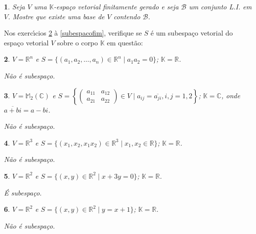 \documentclass[12pt]{exam}
\newtheorem{exercicio}{}
\newcommand{\real}{\mathbb{R}}
\newcommand{\complex}{\mathbb{C}}
\newcommand{\cp}[1]{\mathbb{#1}}
\begin{document}
\begin{exercicio}
  Seja $V$ uma $\cp{K}$-espa\c{c}o vetorial finitamente gerado e seja $\mathcal{B}$ um conjunto L.I. em $V$. Mostre que existe uma base de $V$ contendo $\mathcal{B}$.
\end{exercicio}

Nos exerc{\'\i}cios \ref{subespacoinicio} \`a \ref{subespacofim}, verifique se $S$ \'e um subespa\c{c}o vetorial do espa\c{c}o vetorial $V$ sobre o corpo $\cp{K}$ em quest\~ao:
\begin{exercicio}\label{subespacoinicio}
$V = \real^n$ e $S = \{(a_1, a_2, \dots, a_n) \in \real^n \mid a_1a_2 = 0\}$; $\cp{K} = \real$.
\begin{solucao}
  N\~ao \'e subespa\c{c}o.
\end{solucao}
\end{exercicio}

\begin{exercicio}
$V = \cp{M}_2(\complex)$ e $S = \left\{\begin{pmatrix} a_{11} & a_{12}\\ a_{21} & a_{22}\end{pmatrix} \in V \mid a_{ij} = \overline{a_{ji}}, i, j = 1, 2\right\}$; $\cp{K} = \complex$, onde $\overline{a + bi} = a - bi$.
\begin{solucao}
  N\~ao \'e subespa\c{c}o.
\end{solucao}
\end{exercicio}

\begin{exercicio}
$V = \real^3$ e $S = \{(x_1, x_2, x_1x_2) \in \real^3 \mid x_1, x_2 \in \real\}$; $\cp{K} = \real$.
\begin{solucao}
  N\~ao \'e subespa\c{c}o.
\end{solucao}
\end{exercicio}

\begin{exercicio}
$V = \real^2$ e $S = \{(x, y) \in \real^2 \mid x + 3y = 0\}$; $\cp{K} = \real$.
\begin{solucao}
  \'E subespa\c{c}o.
\end{solucao}
\end{exercicio}

\begin{exercicio}
$V = \real^2$ e $S = \{(x, y) \in \real^2 \mid y = x + 1\}$; $\cp{K} = \real$.
\begin{solucao}
  N\~ao \'e subespa\c{c}o.
\end{solucao}
\end{exercicio}
\end{document}
